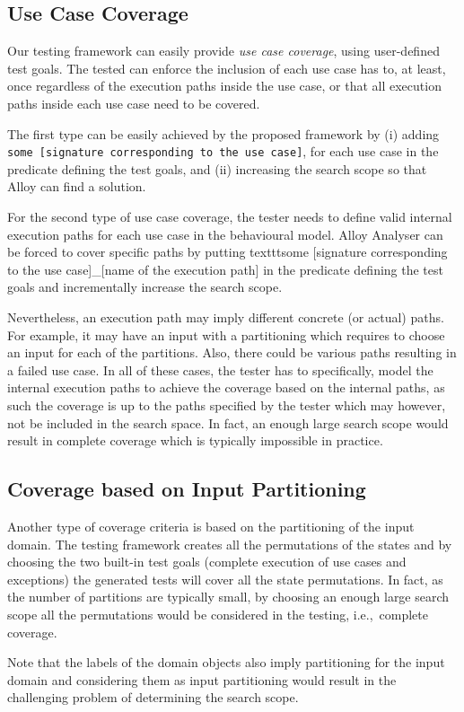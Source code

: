 \subsection{Use Case Coverage}
\label{sec:case-study-usecase-coverage}
Our testing framework can easily provide \textit{use case coverage}, using user-defined test goals. The tested can enforce the inclusion of each use case has to, at least, once regardless of the execution paths inside the use case, or that all execution paths inside each use case need to be covered.

The first type can be easily achieved by the proposed framework by (i) adding \texttt{some [signature corresponding to the use case]}, for each use case in the predicate defining the test goals, and (ii) increasing the search scope so that Alloy can find a solution. 

For the second type of use case coverage, the tester needs to define valid internal execution paths for each use case in the behavioural model. Alloy Analyser can be forced to cover specific paths by putting texttt{some [signature corresponding to the use case]\_[name of the execution path]} in the predicate defining the test goals and incrementally increase the search scope.

Nevertheless, an execution path may imply different concrete (or actual) paths. For example, it may have an input with a partitioning which requires to choose an input for each of the partitions. Also, there could be various paths resulting in a failed use case. In all of these cases, the tester has to specifically, model the internal execution paths to achieve the coverage  based on the internal paths, as such the coverage is up to the paths specified by the tester which may however, not be included in the search space. In fact, an enough large search scope would result in complete coverage which is typically impossible in practice.

\subsection{Coverage based on Input Partitioning}
\label{sec:case-study-partitioning-coverage}
Another type of coverage criteria is based on the partitioning of the input domain. The testing framework creates all the permutations of the states and by choosing the two built-in test goals (complete execution of use cases and exceptions) the generated tests will cover all the state permutations. In fact, as the number of partitions are typically small, by choosing an enough large search scope all the permutations would be considered in the testing, i.e.,\ complete coverage.

Note that the labels of the domain objects also imply partitioning for the input domain and considering them as input partitioning would result in the challenging problem of determining the search scope.